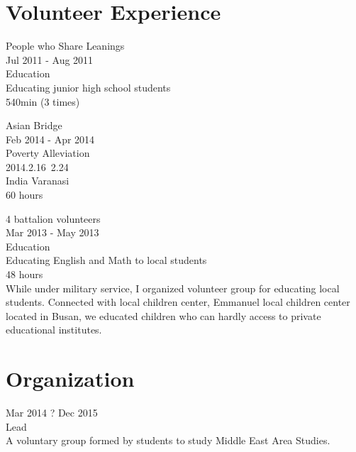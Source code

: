 \documentclass[10pt]{article} %
\begin{document}

\if{}
\section{Volunteer Experience}

{
People who Share Leanings\\
Jul 2011 - Aug 2011\\
Education\\
Educating junior high school students\\
540min (3 times)
}


{
Asian Bridge\\
Feb 2014 - Apr 2014\\
Poverty Alleviation\\
2014.2.16~2.24\\
India Varanasi\\
60 hours
}

{
4 battalion volunteers\\
Mar 2013 - May 2013\\
Education\\
Educating English and Math to local students\\
48 hours\\
While under military service, I organized volunteer group for educating local students. Connected with local children center, Emmanuel local children center located in Busan, we educated children who can hardly access to private educational institutes.
}
\fi


\if{}
\section{Organization}

{
Mar 2014 ? Dec 2015\\
Lead\\
A voluntary group formed by students to study Middle East Area Studies.
}

\fi

\end{document}
